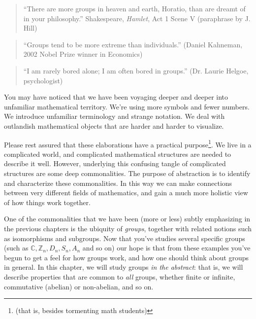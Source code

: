 



\begin{quote}
``There are more groups in heaven and earth, Horatio, than are dreamt of in your philosophy.'' Shakespeare, \emph{Hamlet}, Act 1 Scene V (paraphrase by J. Hill)
\end{quote}

\begin{quote}
``Groups tend to be more extreme than individuals.'' (Daniel Kahneman, 2002 Nobel Prize winner in Economics)
\end{quote}

\begin{quote}
``I am rarely bored alone; I am often bored in groups.'' (Dr. Laurie Helgoe, psychologist)
\end{quote}

You may have noticed that we have been voyaging deeper and deeper into unfamiliar mathematical territory. We're using more symbols and fewer numbers. We introduce unfamiliar terminology and strange notation. We deal with outlandish mathematical objects that are harder and harder to visualize. 

Please rest assured that these elaborations have a practical purpose\footnote{(that is, besides tormenting math students)}. We live in a complicated world, and complicated mathematical structures are needed to describe it well. However, underlying this confusing tangle of complicated structures are some deep commonalities. The purpose of abstraction is to identify and characterize these commonalities. In this way we can make connections between very different fields of mathematics, and gain a much more holistic view of how things work together.
 
One of the commonalities that we have been (more or less) subtly emphasizing in the previous chapters is the ubiquity of \emph{groups}, together with related notions such as isomorphisms and subgroups. Now that you've studies several specific groups (such as ${\mathbb C}, {\mathbb Z}_n, D_n, S_n, A_n$ and so on) our hope is that from these examples you've begun to get a feel for how groups work, and how one should think about groups in general. In this chapter, we will study groups \emph{in the abstract}: that is, we will describe properties that are common to \emph{all} groups, whether finite or infinite, commutative (abelian) or non-abelian, and so on.
\medskip

